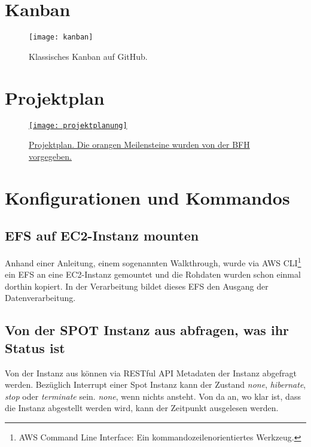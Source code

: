 \section{Kanban}\label{appendix:kanban}
\begin{figure}[H]
	\centering
	\texttt{[image: kanban]}
	\caption{Klassisches Kanban auf GitHub.}
	\label{fig:Klassisches Kanban}
\end{figure}

\section{Projektplan}\label{appendix:projektplan}
\begin{figure}[H]
	\centering
	\href{https://docs.google.com/spreadsheets/d/1zKTZgt4BW736G0xRfU9o3vWYwAJj-8nzFvGsPR7yJ_0/edit?usp=sharing}{
	\texttt{[image: projektplanung]}}
	\caption{\href{https://docs.google.com/spreadsheets/d/1zKTZgt4BW736G0xRfU9o3vWYwAJj-8nzFvGsPR7yJ_0/edit?usp=sharing}{Projektplan. Die orangen Meilensteine wurden von der BFH vorgegeben.}}
	\label{fig:Projektplan}
\end{figure}

\section{Konfigurationen und Kommandos}
\subsection{EFS auf EC2-Instanz mounten}
Anhand einer Anleitung, einem sogenannten Walkthrough, wurde via AWS CLI\footnote{AWS Command Line Interface: Ein kommandozeilenorientiertes Werkzeug.} ein
EFS an eine EC2-Instanz gemountet und die Rohdaten wurden schon einmal dorthin kopiert. In der Verarbeitung bildet dieses EFS den Ausgang der Datenverarbeitung.


\subsection{Von der SPOT Instanz aus abfragen, was ihr Status ist}\label{appendix:restful}
Von der Instanz aus können via RESTful API Metadaten der Instanz abgefragt werden. Bezüglich Interrupt einer Spot Instanz kann der Zustand \emph{none}, \emph{hibernate}, \emph{stop} oder \emph{terminate} sein. \emph{none}, wenn nichts ansteht. Von da an, wo klar ist, dass die Instanz abgestellt werden wird, kann der Zeitpunkt ausgelesen werden.

